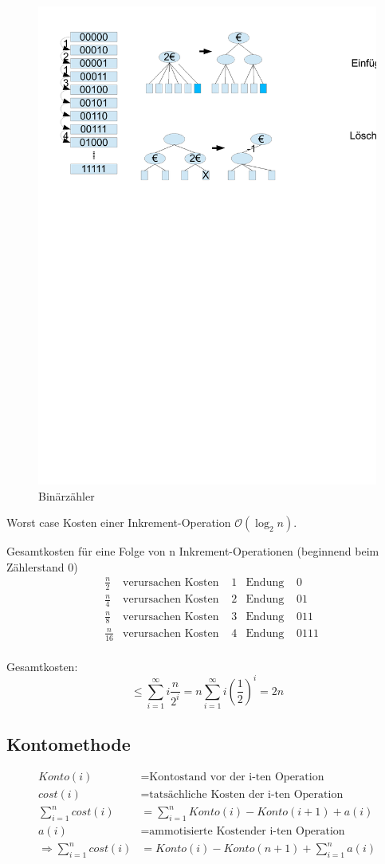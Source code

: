 \documentclass[a4paper,twoside,10pt]{report}
\begin{document}
{\begin{figure}[H]\center
\includegraphics[trim= 1cm 18cm 15cm 1cm,clip,width=0.5\columnwidth]{zaehler.pdf}
\caption{Binärzähler}
\end{figure}

Worst case Kosten einer Inkrement-Operation $\mathcal O(\log_2n)$.

Gesamtkosten für eine Folge von n Inkrement-Operationen (beginnend beim Zählerstand 0)
\begin{align*}
&\frac{n}{2}&\mbox{verursachen Kosten }&1&\mbox{Endung }&0\\
&\frac{n}{4}&\mbox{verursachen Kosten }&2&\mbox{Endung }&01\\
&\frac{n}{8}&\mbox{verursachen Kosten }&3&\mbox{Endung }&011\\
&\frac{n}{16}&\mbox{verursachen Kosten }&4&\mbox{Endung }&0111\\
\end{align*}

Gesamtkosten:\\
\[\le \sum_{i=1}^\infty i\frac{n}{2^i}=n\sum_{i=1}^\infty i\left(\frac{1}{2}\right)^i =2n\]


\subsection{Kontomethode}
\begin{align*}
Konto(i)&= \mbox{Kontostand vor der i-ten Operation}\\
cost(i)&=\mbox{tatsächliche Kosten der i-ten Operation}\\
\sum_{i=1}^n cost(i)&=\sum_{i=1}^n Konto(i)-Konto(i+1)+a(i)\\
a(i)&=\mbox{ammotisierte Kostender i-ten Operation}\\
\Rightarrow \sum_{i=1}^n cost(i)&=Konto(i)-Konto(n+1)+\sum_{i=1}^n a(i)
\end{align*}

}
\end{document}
